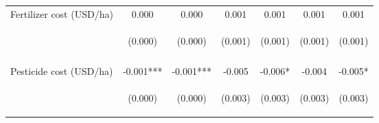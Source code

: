 \begin{center}
\begin{tabular}{lcccccc}
Fertilizer cost (USD/ha) & 0.000 & 0.000 & 0.001 & 0.001 & 0.001 & 0.001 \\
 & \begin{footnotesize}(0.000)\end{footnotesize} & \begin{footnotesize}(0.000)\end{footnotesize} & \begin{footnotesize}(0.001)\end{footnotesize} & \begin{footnotesize}(0.001)\end{footnotesize} & \begin{footnotesize}(0.001)\end{footnotesize} & \begin{footnotesize}(0.001)\end{footnotesize} \\
\vspace{4pt} & \begin{footnotesize}[0.724]\end{footnotesize} & \begin{footnotesize}[0.573]\end{footnotesize} & \begin{footnotesize}[0.206]\end{footnotesize} & \begin{footnotesize}[0.174]\end{footnotesize} & \begin{footnotesize}[0.219]\end{footnotesize} & \begin{footnotesize}[0.189]\end{footnotesize} \\
Pesticide cost (USD/ha) & -0.001*** & -0.001*** & -0.005 & -0.006* & -0.004 & -0.005* \\
 & \begin{footnotesize}(0.000)\end{footnotesize} & \begin{footnotesize}(0.000)\end{footnotesize} & \begin{footnotesize}(0.003)\end{footnotesize} & \begin{footnotesize}(0.003)\end{footnotesize} & \begin{footnotesize}(0.003)\end{footnotesize} & \begin{footnotesize}(0.003)\end{footnotesize} \\

\end{tabular}
\end{center}
